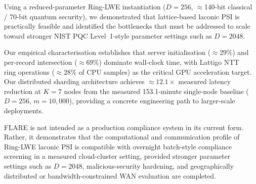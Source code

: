\documentclass[preprint,12pt]{elsarticle}
\begin{document}
Using a reduced-parameter Ring-LWE instantiation ($D=256$,
$\approx$140-bit classical / 70-bit quantum security), we demonstrated that
lattice-based laconic PSI is practically feasible and identified the
bottlenecks that must be addressed to scale toward stronger NIST
PQC Level~1-style parameter settings such as $D=2048$.

Our empirical characterisation establishes that server initialisation
($\approx 29\%$) and per-record intersection ($\approx 69\%$) dominate
wall-clock time, with Lattigo NTT ring operations ($\approx 28\%$ of CPU
samples) as the critical GPU acceleration target. Our distributed sharding
architecture achieves $\approx 12.1\times$ measured latency reduction at $K=7$ nodes
from the measured 153.1-minute single-node baseline ($D=256$, $m=10{,}000$),
providing a concrete engineering path to larger-scale deployments.

FLARE is not intended as a production compliance system in its current form.
Rather, it demonstrates that the computational and communication profile of
Ring-LWE laconic PSI is compatible with overnight batch-style compliance
screening in a measured cloud-cluster setting, provided stronger parameter
settings such as $D=2048$, malicious-security hardening, and geographically
distributed or bandwidth-constrained WAN evaluation are completed.





\end{document}
